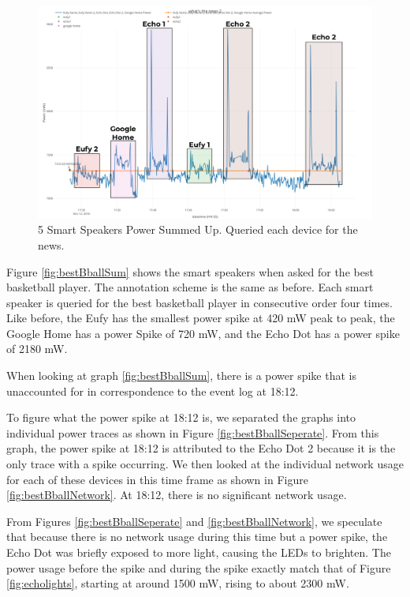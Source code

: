 \begin{figure}[H]
  \centering
  \includegraphics[width=1\textwidth]{figures/mixedNewsSum.png}
  \caption{5 Smart Speakers Power Summed Up. Queried each device for the news.}
  \label{fig:mixedNewsSum}
\end{figure}

Figure \ref{fig:bestBballSum} shows the smart speakers when asked for the best basketball player. The annotation scheme is the same as before. Each smart speaker is queried for the best basketball player in consecutive order four times. Like before, the Eufy has the smallest power spike at 420 mW peak to peak, the Google Home has a power Spike of 720 mW, and the Echo Dot has a power spike of 2180 mW.

When looking at graph \ref{fig:bestBballSum}, there is a power spike that is unaccounted for in correspondence to the event log at 18:12.

To figure what the power spike at 18:12 is, we separated the graphs into individual power traces as shown in Figure \ref{fig:bestBballSeperate}. From this graph, the power spike at 18:12 is attributed to the Echo Dot 2 because it is the only trace with a spike occurring. We then looked at the individual network usage for each of these devices in this time frame as shown in Figure \ref{fig:bestBballNetwork}. At 18:12, there is no significant network usage.

From Figures \ref{fig:bestBballSeperate} and \ref{fig:bestBballNetwork}, we speculate that because there is no network usage during this time but a power spike, the Echo Dot was briefly exposed to more light, causing the LEDs to brighten. The power usage before the spike and during the spike exactly match that of Figure \ref{fig:echolights}, starting at around 1500 mW, rising to about 2300 mW.

